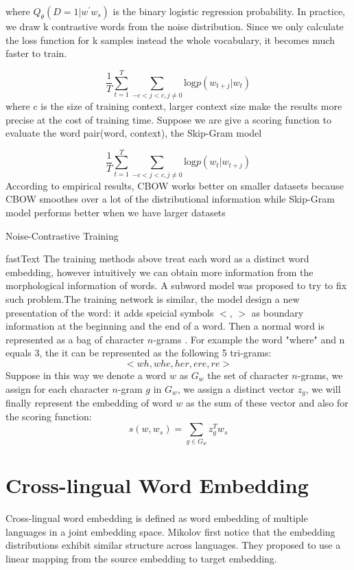 	where ${Q_{\theta}{(D=1| w^{\prime} w_s)}}$ is the binary logistic regression probability. In practice, we draw k contrastive words from the noise distribution. Since we only calculate the loss function for k samples instead the whole vocabulary, it becomes much faster to train.
	
	
	\[\frac{1}{T} \sum_{t=1}^{T} \sum_{-c<j<c, j\neq 0}{\textrm{log}{p(w_{t+j}|w_t)}}\]
	where c is the size of training context, larger context size make the results more precise at the cost of training time. Suppose we are give a scoring function to evaluate the word pair(word, context), the Skip-Gram model
	
	\[\frac{1}{T} \sum_{t=1}^{T} \sum_{-c<j<c, j\neq 0}{\textrm{log}{p(w_{t}|w_{t+j})}}\]
	 According to  empirical results, CBOW works better on smaller datasets because CBOW smoothes over a lot of the distributional information while Skip-Gram model performs better when we have larger datasets
	
	
	Noise-Contrastive Training
	
	
	fastText
	The training methods above treat each word as a distinct word embedding, however intuitively we can obtain more information from the morphological information of words. A subword model was proposed to try to fix such problem.The training network is similar, the model design a new presentation of the word: it adds speicial symbols $<$, ${>}$ as boundary information at the beginning and the end of a word. Then a normal word is represented as a bag of character $n$-grams . For example the word "where" and n equals 3, the it can be represented as the following 5 tri-grams: 
	\[ <wh, whe, her, ere, re>\]
	Suppose in this way we denote a word ${w}$ as ${G_{w}}$ the set of character ${n}$-grams, we assign for each character ${n}$-gram $g$ in ${G_{w}}$, we assign a distinct vector $z_g$, we will finally represent the embedding of word ${w}$ as the sum of these vector and also for the scoring function:
	\[s(w, w_s) = \sum_{g \in G_{w}} z_g^{T} w_s \]
	
\section{Cross-lingual Word Embedding}
	Cross-lingual word embedding is defined as word embedding of multiple languages in a joint embedding space. Mikolov first notice that the embedding distributions exhibit similar structure across languages. They proposed to use a linear mapping from the source embedding to target embedding. \\
	
